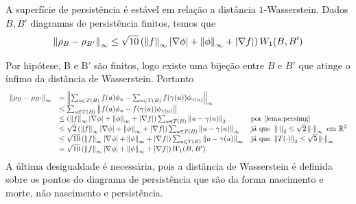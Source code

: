\begin{teo}\label{teo:surf_stab}
  A superfície de persistência é estável em relação a distância $1$-Wasserstein. Dados $B,B'$ diagramas de 
  persistência finitos, temos que 
  \begin{equation*}
    \left\lVert\rho_B - \rho_{B'}\right\rVert_\infty \leq \sqrt{10} 
    \left( \left\lVert f\right\rVert_\infty \left\lvert\nabla \phi\right\rvert + \left\lVert\phi\right\rVert_\infty + \left\lvert\nabla f\right\rvert\right) W_1(B,B')
  \end{equation*}
\end{teo}
\begin{demonstracao}
  Por hipótese, B e B' são finitos, logo existe uma bijeção entre $B$ e $B'$ que atinge o ínfimo da distância 
  de Wasserstein. Portanto
  \begin{align*}
  \begin{array}{lll}
    \left\lVert\rho_B - \rho_{B'}\right\rVert_\infty &= 
                \left\lVert\sum_{u\in T(B)}f(u)\phi_u - \sum_{u\in T(B)}f(\gamma(u))\phi_{\gamma(u)}\right\rVert_\infty \\
    &\leq \sum_{u\in T(B)} \left\lVert f(u)\phi_u - f(\gamma(u))\phi_{\gamma(u)}\right\rVert & \\
    &\leq \left( \left\lVert f\right\rVert_\infty \left\lvert\nabla \phi\right\rvert + \left\lVert\phi\right\rVert_\infty + \left\lvert\nabla f\right\rvert\right) 
            \sum_{u\in T(B)} \left\lVert u-\gamma(u)\right\rVert_2 &  \text{por \ref{lema:persimg}}\\
    &\leq \sqrt{2} \left( \left\lVert f\right\rVert_\infty \left\lvert\nabla \phi\right\rvert + \left\lVert\phi\right\rVert_\infty + \left\lvert\nabla f\right\rvert\right) 
            \sum_{u\in T(B)} \left\lVert u-\gamma(u)\right\rVert_\infty & \text{já que } \left\lVert\cdot\right\rVert_2 \leq \sqrt{2} 
            \left\lVert\cdot\right\rVert_\infty \text{ em } \mathbb{R}^2 \\
    &\leq \sqrt{10} \left( \left\lVert f\right\rVert_\infty \left\lvert\nabla \phi\right\rvert + \left\lVert\phi\right\rVert_\infty + \left\lvert\nabla f\right\rvert\right) 
             \sum_{u\in T(B)} \left\lVert u-\gamma(u)\right\rVert_\infty & \text{já que } \left\lVert T(\cdot)\right\rVert_2 
             \leq \sqrt{5}\left\lVert\cdot\right\rVert_\infty\\
    &=\sqrt{10} \left( \left\lVert f\right\rVert_\infty \left\lvert\nabla \phi\right\rvert + \left\lVert\phi\right\rVert_\infty + \left\lvert\nabla f\right\rvert\right) W_1(B,B'). &
  \end{array}
  \end{align*}
A última desigualdade é necessária, pois a distância de Wasserstein é definida sobre os pontos do diagrama de 
persistência que são da forma nascimento e morte, não nascimento e persistência. 
\end{demonstracao}

